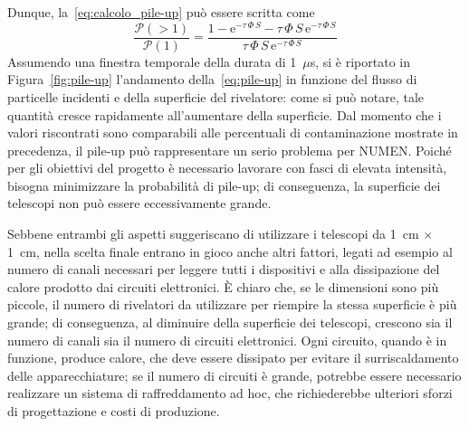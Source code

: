 Dunque, la~\ref{eq:calcolo_pile-up} può essere scritta come
\begin{equation} \label{eq:pile-up}
\frac{\mathcal{P}(> \! 1)}{\mathcal{P}(1)} = \frac{1 - 
	\mbox{e}^{- \tau \, \Phi \, S} - \tau \, \Phi \, S \,\mbox{e}^{- \tau\, \Phi \, S}}{\tau \, \Phi \, S \, \mbox{e}^{- \tau \, \Phi \, S}}
\end{equation} 
Assumendo una finestra temporale della durata di 1~$\mu$s, si è riportato in Figura~\ref{fig:pile-up} l'andamento della~\ref{eq:pile-up} in funzione del flusso di particelle incidenti e della superficie del rivelatore: come si può notare, tale quantità cresce rapidamente all'aumentare della superficie.
Dal momento che i valori riscontrati sono comparabili alle percentuali di contaminazione mostrate in precedenza, il pile-up può rappresentare un serio problema per NUMEN.
Poiché per gli obiettivi del progetto è necessario lavorare con fasci di elevata intensità, bisogna minimizzare la probabilità di pile-up; di conseguenza, la superficie dei telescopi non può essere eccessivamente grande.






Sebbene entrambi gli aspetti suggeriscano di utilizzare i telescopi da 1~cm $\times$ 1~cm, nella scelta finale entrano in gioco anche altri fattori, legati ad esempio al numero di canali necessari per leggere tutti i dispositivi e alla dissipazione del calore prodotto dai circuiti elettronici.
È chiaro che, se le dimensioni sono più piccole, il numero di rivelatori da utilizzare per riempire la stessa superficie è più grande; di conseguenza, al diminuire della superficie dei telescopi, crescono sia il numero di canali sia il numero di circuiti elettronici.
Ogni circuito, quando è in funzione, produce calore, che deve essere dissipato per evitare il surriscaldamento delle apparecchiature; se il numero di circuiti è grande, potrebbe essere necessario realizzare un sistema di raffreddamento ad hoc, che richiederebbe ulteriori sforzi di progettazione e costi di produzione.

